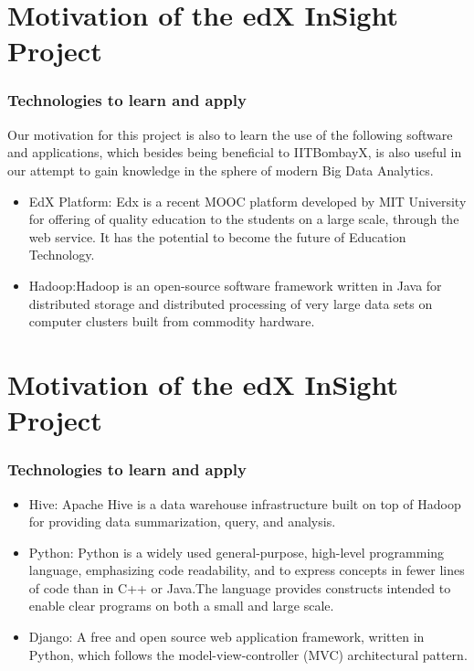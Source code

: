 \documentclass[12pt,xcolor=dvipsnames]{beamer}
\begin{document}
\section{Motivation of the edX InSight Project}
\begin{frame}[t]
\frametitle{Technologies to learn and apply}

Our motivation for this project is also to learn the use of the following software and applications, which besides being beneficial to IITBombayX, is also useful in our attempt to gain knowledge in the sphere of modern Big Data Analytics.

\begin{itemize}

\item EdX Platform: Edx is a recent MOOC platform developed by MIT University for offering of quality education to the students on  a large scale, through the web service. It has the potential to become the future of Education Technology.

\item Hadoop:Hadoop is an open-source software framework written in Java for distributed storage and distributed processing of very large data sets on computer clusters built from commodity hardware.

\end{itemize}
\end{frame}

\section{Motivation of the edX InSight Project}
\begin{frame}[t]
\frametitle{Technologies to learn and apply}

\begin{itemize}

\item Hive: Apache Hive is a data warehouse infrastructure built on top of Hadoop for providing data summarization, query, and analysis.

\item Python: Python is a widely used general-purpose, high-level programming language, emphasizing code readability, and  to express concepts in fewer lines of code than in C++ or Java.The language provides constructs intended to enable clear programs on both a small and large scale.

\item Django: A free and open source web application framework, written in Python, which follows the model-view-controller (MVC) architectural pattern.

\end{itemize}
\end{frame}
\end{document}
